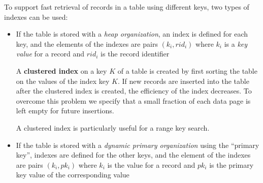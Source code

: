 To support fast retrieval of records in a table using different keys, two types of indexes can be used:
\begin{itemize}
    \item If the table is stored with a \textit{heap organization}, an index is defined for each key, and the elements of the indexes are pairs \((k_i,rid_i)\) where \(k_i\) is a \textit{key value} for a record and \(rid_i\) is the record identifier
    \begin{tcolorbox}
    A \textbf{clustered index} on a key \(K\) of a table is created by first sorting the table on the values of the index key \(K\). If new records are inserted into the table after the clustered index is created, the efficiency of the index decreases. To overcome this problem we specify that a small fraction of each data page is left empty for future insertions.
    \end{tcolorbox}
    A clustered index is particularly useful for a range key search.
    \item If the table is stored with a \textit{dynamic primary organization} using the “primary key”, indexes are defined for the other keys, and the element of the indexes are pairs \((k_i, pk_i)\) where \(k_i\) is the value for a record and \(pk_i\) is the primary key value of the corresponding value
\end{itemize}

